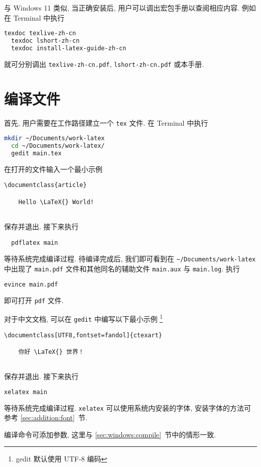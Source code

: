 与 Windows 11 类似,
当正确安装后,
用户可以调出宏包手册以查阅相应内容.
例如在 \textsf{Terminal} 中执行
\begin{lstlisting}[language=bash]
  texdoc texlive-zh-cn
  texdoc lshort-zh-cn
  texdoc install-latex-guide-zh-cn
\end{lstlisting}
就可分别调出 \texttt{texlive-zh-cn.pdf},
\texttt{lshort-zh-cn.pdf}
或本手册.

\section{编译文件}

首先, 用户需要在工作路径建立一个 \texttt{tex} 文件.
在 \textsf{Terminal} 中执行
\begin{lstlisting}[language = bash]
  mkdir ~/Documents/work-latex
  cd ~/Documents/work-latex/
  gedit main.tex
\end{lstlisting}
在打开的文件输入一个最小示例
\begin{lstlisting}[language = {[LaTeX]TeX}]
  \documentclass{article}
  
    Hello \LaTeX{} World!
  
\end{lstlisting}
保存并退出. 
接下来执行
\begin{lstlisting}
  pdflatex main
\end{lstlisting}
等待系统完成编译过程. 
待编译完成后,
我们即可看到在 \texttt{\~{}/Documents/work-latex} 中出现了
\texttt{main.pdf} 文件和其他同名的辅助文件 \texttt{main.aux} 与
\texttt{main.log}. 
执行
\begin{lstlisting}[language=bash]
  evince main.pdf
\end{lstlisting}
即可打开 \texttt{pdf} 文件.

对于中文文档, 可以在 \texttt{gedit} 中编写以下最小示例%
\footnote{gedit 默认使用 UTF-8 编码}%
\begin{lstlisting}[language={[LaTeX]TeX}]
  \documentclass[UTF8,fontset=fandol]{ctexart}
  
    你好 \LaTeX{} 世界！
  
\end{lstlisting}
保存并退出.
接下来执行
\begin{lstlisting}[language=bash]
  xelatex main
\end{lstlisting}
等待系统完成编译过程.
\texttt{xelatex} 可以使用系统内安装的字体,
安装字体的方法可参考 \ref{sec:addition:font}~节.

编译命令可添加参数, 这里与 \ref{sec:windows:compile}~节中的情形一致.
